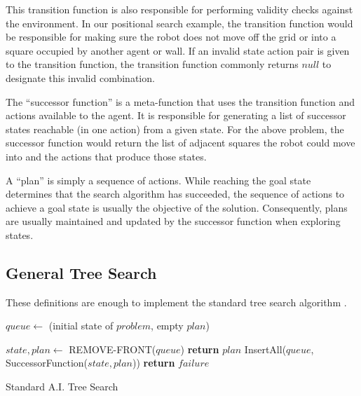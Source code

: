 This transition function is also responsible for performing validity checks against the environment. In our positional search example, the transition function would be responsible for making sure the robot does not move off the grid or into a square occupied by another agent or wall. If an invalid state action pair is given to the transition function, the transition function commonly returns $null$ to designate this invalid combination.

The ``successor function'' is a meta-function that uses the transition function and actions available to the agent. It is responsible for generating a list of successor states reachable (in one action) from a given state. For the above problem, the successor function would return the list of adjacent squares the robot could move into and the actions that produce those states.

A ``plan'' is simply a sequence of actions. While reaching the goal state determines that the search algorithm has succeeded, the sequence of actions to achieve a goal state is usually the objective of the solution. Consequently, plans are usually maintained and updated by the successor function when exploring states.

	\subsection{General Tree Search}

These definitions are enough to implement the standard tree search algorithm \cite{AIBook}.

\begin{algorithm}[H]\label{treeSearch}
\begin{algorithmic}[1]
	\State $queue \gets$ (initial state of $problem$, empty $plan$)

		\State $state, plan \gets$ REMOVE-FRONT($queue$)
			\State \textbf{return} $plan$ 
		\EndIf
		\State InsertAll($queue$, SuccessorFunction($state, plan$)) 
	\EndWhile
	\State \textbf{return} $failure$ 

\EndFunction

\end{algorithmic}
\caption{Standard A.I. Tree Search}
\end{algorithm}

